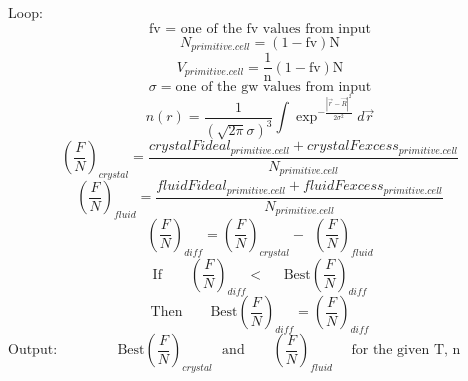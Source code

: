 \documentclass[double,12pt]{beavtex}
\begin{document}
Loop: 
\begin{displaymath}\text{fv = one of the fv values from input}\end{displaymath}
\begin{equation}N_{primitive.cell}=(1-\text{fv})\text{N}\end{equation}
\begin{equation}V_{primitive.cell}=\frac{\text{1}}{\text{n}}(1-\text{fv})\text{N}\end{equation}
\begin{displaymath}\sigma = \text{one of the gw values from input}\end{displaymath}
\begin{equation}{n(r)=\frac{1}{\left(\sqrt{2\pi}\sigma\right)^3}\int\exp^{-\frac{|\vec{r}-\vec{R}|^2}{2\sigma^2}}d\vec{r}}\end{equation} 
\begin{equation}\left(\frac{F}{N}\right)_{crystal}=\frac{crystalFideal_{primitive.cell} + crystalFexcess_{primitive.cell}}{N_{primitive.cell}}\end{equation}
\begin{equation}\left(\frac{F}{N}\right)_{fluid}=\frac{fluidFideal_{primitive.cell} + fluidFexcess_{primitive.cell}}{N_{primitive.cell}}\end{equation}
\begin{equation}\left(\frac{F}{N}\right)_{diff}=\left(\frac{F}{N}\right)_{crystal}-{~~}\left(\frac{F}{N}\right)_{fluid}\end{equation}
\begin{displaymath}\text{If~~~~~~}\left(\frac{F}{N}\right)_{diff}<\text{~~~~Best}\left(\frac{F}{N}\right)_{diff}\end{displaymath}
\begin{displaymath}\text{Then~~~~~~}\text{Best}\left(\frac{F}{N}\right)_{diff}=\left(\frac{F}{N}\right)_{diff}\end{displaymath}
\begin{displaymath}\text{Output:~~~~~~~~~~~~ Best}\left(\frac{F}{N}\right)_{crystal}\text{~~and~~~~~~}\left(\frac{F}{N}\right)_{fluid}\text{~~~~for the given T, n ~~~~~~~~~~~~~~~~~~~~~~~~~}\end{displaymath} 




\end{document}

